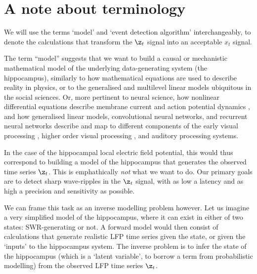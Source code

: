 



\section{A note about terminology}

We will use the terms `model' and `event detection algorithm'
interchangeably, to denote the calculations that transform the $\z_t$ signal
into an acceptable $x_t$ signal.

The term ``model'' suggests that we want to build a causal or mechanistic
mathematical model of the underlying data-generating system (the
hippocampus), similarly to how mathematical equations are used to describe
reality in physics, or to the generalised and multilevel linear models
ubiquitous in the social sciences. Or, more pertinent to neural science, how
nonlinear differential equations describe membrane current and action
potential dynamics \cite{Hodgkin1952}, and how generalised linear models,
convolutional neural networks, and recurrent neural networks describe and map
to different components of the early visual processing \cite{Mante2005},
higher order visual processing \cite{Nayebi2018}, and auditory processing
\cite{Kell2018} systems.
%

In the case of the hippocampal local electric field potential, this would
thus correspond to building a model of the hippocampus that generates the
observed time series $\z_t$. This is emphathically \emph{not} what we want to
do. Our primary goals are to detect sharp wave-ripples in the $\z_t$ signal,
with as low a latency and as high a precision and sensitivity as possible.

We can frame this task as an inverse modelling problem however. Let us
imagine a very simplified model of the hippocampus, where it can exist in
either of two states: SWR-generating or not. A forward model would then
consist of calculations that generate realistic LFP time series given the
state, or given the `inputs' to the hippocampus system. The inverse problem
is to infer the state of the hippocampus (which is a `latent variable', to
borrow a term from probabilistic modelling) from the observed LFP time series
$\z_t$.

